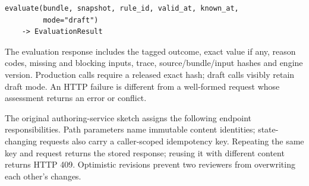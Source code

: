 \documentclass[12pt,a4paper,oneside,openany]{book}
\begin{document}
\begin{minipage}{\textwidth}
\begin{lstlisting}
evaluate(bundle, snapshot, rule_id, valid_at, known_at,
         mode="draft")
    -> EvaluationResult
\end{lstlisting}
\end{minipage}

The evaluation response includes the tagged outcome, exact value if any, reason codes,
missing and blocking inputs, trace, source/bundle/input hashes and engine version.
Production calls require a released exact hash; draft calls visibly retain draft
mode. An HTTP failure is different from a well-formed request whose assessment
returns an error or conflict.

The original authoring-service sketch assigns the following endpoint responsibilities. Path parameters name
immutable content identities; state-changing requests also carry a caller-scoped
idempotency key. Repeating the same key and request returns the stored response;
reusing it with different content returns HTTP 409. Optimistic revisions prevent
two reviewers from overwriting each other's changes.
\begingroup\small
\end{document}
